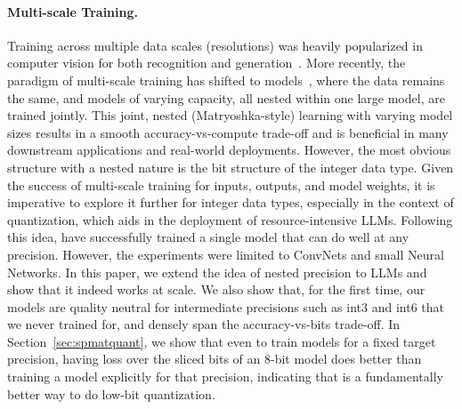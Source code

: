 \paragraph{Multi-scale Training.} Training across multiple data scales (resolutions) was heavily popularized in computer vision for both recognition and generation~\citep{adelson1984pyramid,lin2017feature,denton2015deep}. More recently, the paradigm of multi-scale training has shifted to models~\citep{rippel2014learning,yu2018slimmable,kusupati2022matryoshka,devvrit2023matformer}, where the data remains the same, and models of varying capacity, all nested within one large model, are trained jointly. This joint, nested (Matryoshka-style) learning with varying model sizes results in a smooth accuracy-vs-compute trade-off and is beneficial in many downstream applications and real-world deployments. However, the most obvious structure with a nested nature is the bit structure of the integer data type. Given the success of multi-scale training for inputs, outputs, and model weights, it is imperative to explore it further for integer data types, especially in the context of quantization, which aids in the deployment of resource-intensive LLMs. Following this idea, \citet{any_precision_dnn} have successfully trained a single model that can do well at any precision. However, the experiments were limited to ConvNets and small Neural Networks. In this paper, we extend the idea of nested precision to LLMs and show that it indeed works at scale. We also show that, for the first time, our models are quality neutral for intermediate precisions such as int3 and int6 that we never trained for, and densely span the accuracy-vs-bits trade-off. In Section~\ref{sec:spmatquant}, we show that even to train models for a fixed target precision, having loss over the sliced bits of an 8-bit model does better than training a model explicitly for that precision, indicating that \alg is a fundamentally better way to do low-bit quantization.

